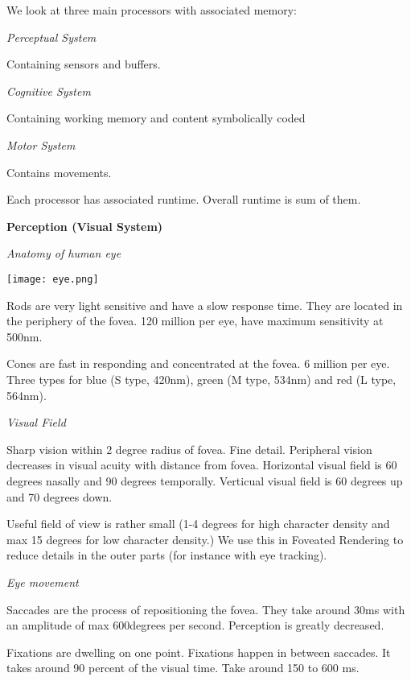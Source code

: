\columnbreak

We look at three main processors with associated memory: \smallskip

\textit{Perceptual System} \smallskip

Containing sensors and buffers. \medskip

\textit{Cognitive System} \smallskip

Containing working memory and content symbolically coded \medskip

\textit{Motor System} \smallskip

Contains movements. \medskip

Each processor has associated runtime. Overall runtime is sum of them.  \medskip

\textbf{Perception (Visual System)}


\textit{Anatomy of human eye} \smallskip


\begin{center}
	\texttt{[image: eye.png]}
\end{center}

\medskip

Rods are very light sensitive and have a slow response time. They are located in the periphery of the fovea. 120 million per eye, have maximum sensitivity at 500nm. \medskip

Cones are fast in responding and concentrated at the fovea. 6 million per eye. Three types for blue (S type, 420nm), green (M type, 534nm) and red (L type, 564nm). \medskip


\textit{Visual Field} \smallskip

Sharp vision within 2 degree radius of fovea. Fine detail. Peripheral vision decreases in visual acuity with distance from fovea. Horizontal visual field is 60 degrees nasally and 90 degrees temporally. Verticual visual field is 60 degrees up and 70 degrees down. \medskip

Useful field of view is rather small (1-4 degrees for high character density and max 15 degrees for low character density.) We use this in Foveated Rendering to reduce details in the outer parts (for instance with eye tracking). \medskip

\textit{Eye movement} \smallskip

Saccades are the process of repositioning the fovea. They take around 30ms with an amplitude of max 600degrees per second. Perception is greatly decreased.\medskip

Fixations are dwelling on one point. Fixations happen in between saccades. It takes around 90 percent of the visual time. Take around 150 to 600 ms. \medskip

